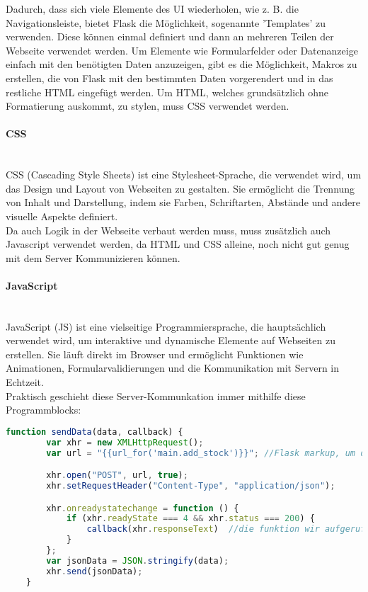 Dadurch, dass sich viele Elemente des UI wiederholen, wie z. B. die Navigationsleiste, bietet Flask die Möglichkeit, sogenannte 'Templates' zu verwenden. Diese können einmal definiert und dann an mehreren Teilen der Webseite verwendet werden.
Um Elemente wie Formularfelder oder Datenanzeige einfach mit den benötigten Daten anzuzeigen, gibt es die Möglichkeit, Makros zu erstellen, die von Flask mit den bestimmten Daten vorgerendert und in das restliche HTML eingefügt werden.
Um HTML, welches grundsätzlich ohne Formatierung auskommt, zu stylen, muss CSS verwendet werden.

\paragraph{CSS}\mbox{}\\
CSS (Cascading Style Sheets) ist eine Stylesheet-Sprache, die verwendet wird, um das Design und Layout von Webseiten zu gestalten. Sie ermöglicht die Trennung von Inhalt und Darstellung, indem sie Farben, Schriftarten, Abstände und andere visuelle Aspekte definiert.\cite{chatgpt}\\

Da auch Logik in der Webseite verbaut werden muss, muss zusätzlich auch Javascript verwendet werden, da HTML und CSS alleine, noch nicht gut genug mit dem Server Kommunizieren können.

\paragraph{JavaScript}\mbox{}\\
JavaScript (JS) ist eine vielseitige Programmiersprache, die hauptsächlich verwendet wird, um interaktive und dynamische Elemente auf Webseiten zu erstellen. Sie läuft direkt im Browser und ermöglicht Funktionen wie Animationen, Formularvalidierungen und die Kommunikation mit Servern in Echtzeit.\cite{chatgpt}\\

Praktisch geschieht diese Server-Kommunkation immer mithilfe diese Programmblocks:

\begin{lstlisting}[language=JavaScript]
    function sendData(data, callback) {
        var xhr = new XMLHttpRequest();
        var url = "{{url_for('main.add_stock')}}"; //Flask markup, um die richtige url zu erreichen, dies wird vor ausgabe auf der Webseite noch eingesetzt

        xhr.open("POST", url, true);
        xhr.setRequestHeader("Content-Type", "application/json");

        xhr.onreadystatechange = function () {
            if (xhr.readyState === 4 && xhr.status === 200) {
                callback(xhr.responseText)  //die funktion wir aufgerufen
            }
        };
        var jsonData = JSON.stringify(data);
        xhr.send(jsonData);
    }
\end{lstlisting}

